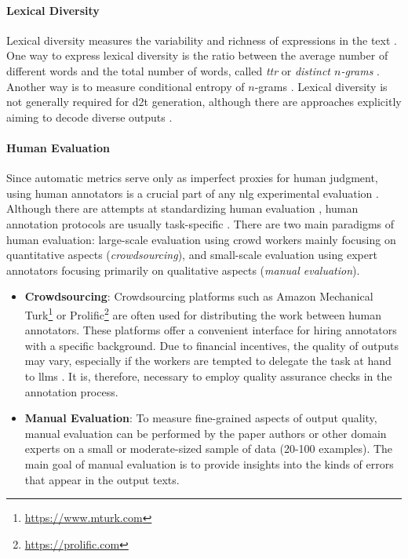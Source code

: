 {\paragraph{Lexical Diversity} Lexical diversity measures the variability and richness of expressions in the text \cite{vanmiltenburgMeasuringDiversityAutomatic2018}. One way to express lexical diversity is the ratio between the average number of different words and the total number of words, called \emph{\ac{ttr}} or \emph{distinct $n$-grams} \cite{johnson1944studies,li2016diversity}. Another way is to measure conditional entropy of $n$-grams \cite{shannon1948mathematical}.
Lexical diversity is not generally required for \ac{d2t} generation, although there are approaches explicitly aiming to decode diverse outputs \cite{hanGeneratingDiverseDescriptions2021,perlitzDiversityEnhancedTabletoText2022}.

\paragraph{Human Evaluation} Since automatic metrics serve only as imperfect proxies for human judgment, using human annotators is a crucial part of any \ac{nlg} experimental evaluation \cite{gehrmannRepairingCrackedFoundation2022}. Although there are attempts at standardizing human evaluation \cite{thomsonGoldStandardMethodology2020}, human annotation protocols are usually task-specific \cite{van2019best,belzDisentanglingPropertiesHuman2020}. There are two main paradigms of human evaluation: large-scale evaluation using crowd workers mainly focusing on quantitative aspects (\emph{crowdsourcing}), and small-scale evaluation using expert annotators focusing primarily on qualitative aspects (\emph{manual evaluation}).

\begin{itemize}
    \item \textbf{Crowdsourcing}: Crowdsourcing platforms such as Amazon Mechanical Turk\footnote{\url{https://www.mturk.com}} or Prolific\footnote{\url{https://prolific.com}} are often used for distributing the work between human annotators. These platforms offer a convenient interface for hiring annotators with a specific background. Due to financial incentives, the quality of outputs may vary, especially if the workers are tempted to delegate the task at hand to \acp{llm} \cite{veselovskyArtificialArtificialArtificial2023}. It is, therefore, necessary to employ quality assurance checks in the annotation process.
    \item \textbf{Manual Evaluation}: To measure fine-grained aspects of output quality, manual evaluation can be performed by the paper authors or other domain experts on a small or moderate-sized sample of data (20-100 examples). The main goal of manual evaluation is to provide insights into the kinds of errors that appear in the output texts.
\end{itemize}


}
